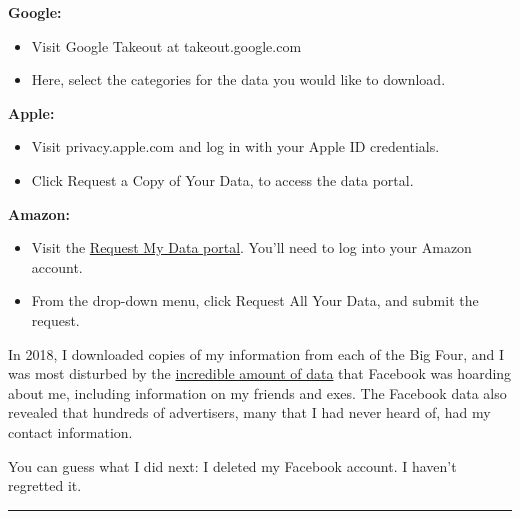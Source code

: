\textbf{Google:}

\begin{itemize}
\tightlist
\item
  Visit Google Takeout at takeout.google.com
\end{itemize}

\begin{itemize}
\tightlist
\item
  Here, select the categories for the data you would like to download.
\end{itemize}

\textbf{Apple:}

\begin{itemize}
\tightlist
\item
  Visit privacy.apple.com and log in with your Apple ID credentials.
\end{itemize}

\begin{itemize}
\tightlist
\item
  Click Request a Copy of Your Data, to access the data portal.
\end{itemize}

\textbf{Amazon:}

\begin{itemize}
\tightlist
\item
  Visit the
  \href{https://www.amazon.com/gp/privacycentral/dsar/preview.html}{Request
  My Data portal}. You'll need to log into your Amazon account.
\end{itemize}

\begin{itemize}
\tightlist
\item
  From the drop-down menu, click Request All Your Data, and submit the
  request.
\end{itemize}

In 2018, I downloaded copies of my information from each of the Big
Four, and I was most disturbed by the
\href{https://www.nytimes.com/2018/04/11/technology/personaltech/i-downloaded-the-information-that-facebook-has-on-me-yikes.html}{incredible
amount of data} that Facebook was hoarding about me, including
information on my friends and exes. The Facebook data also revealed that
hundreds of advertisers, many that I had never heard of, had my contact
information.

You can guess what I did next: I deleted my Facebook account. I haven't
regretted it.

\begin{center}\rule{0.5\linewidth}{\linethickness}\end{center}

